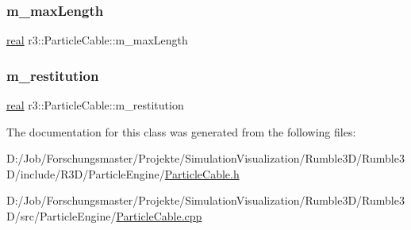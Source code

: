 \subsubsection{\texorpdfstring{m\+\_\+max\+Length}{m\_maxLength}}
{\footnotesize\ttfamily \mbox{\hyperlink{namespacer3_ab2016b3e3f743fb735afce242f0dc1eb}{real}} r3\+::\+Particle\+Cable\+::m\+\_\+max\+Length\hspace{0.3cm}{\ttfamily [protected]}}

\mbox{\label{classr3_1_1_particle_cable_ad03466bf1aeecddec5fd0319be7b2e3d}} 
\subsubsection{\texorpdfstring{m\+\_\+restitution}{m\_restitution}}
{\footnotesize\ttfamily \mbox{\hyperlink{namespacer3_ab2016b3e3f743fb735afce242f0dc1eb}{real}} r3\+::\+Particle\+Cable\+::m\+\_\+restitution\hspace{0.3cm}{\ttfamily [protected]}}



The documentation for this class was generated from the following files\+:\begin{DoxyCompactItemize}
\item 
D\+:/\+Job/\+Forschungsmaster/\+Projekte/\+Simulation\+Visualization/\+Rumble3\+D/\+Rumble3\+D/include/\+R3\+D/\+Particle\+Engine/\mbox{\hyperlink{_particle_cable_8h}{Particle\+Cable.\+h}}\item 
D\+:/\+Job/\+Forschungsmaster/\+Projekte/\+Simulation\+Visualization/\+Rumble3\+D/\+Rumble3\+D/src/\+Particle\+Engine/\mbox{\hyperlink{_particle_cable_8cpp}{Particle\+Cable.\+cpp}}\end{DoxyCompactItemize}
